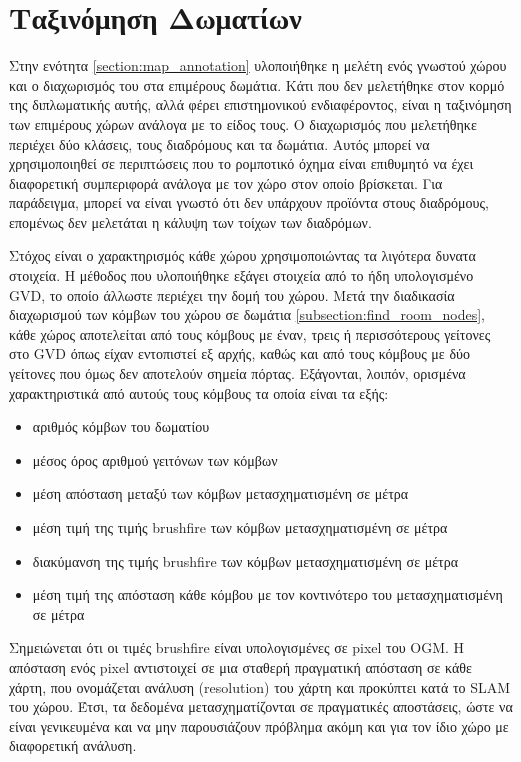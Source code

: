 \chapter{Ταξινόμηση Δωματίων}
\label{section:room_classification}

Στην ενότητα \ref{section:map_annotation} υλοποιήθηκε η μελέτη ενός γνωστού χώρου και ο διαχωρισμός του στα επιμέρους δωμάτια. Κάτι που δεν μελετήθηκε στον κορμό της διπλωματικής αυτής, αλλά φέρει επιστημονικού ενδιαφέροντος, είναι η ταξινόμηση των επιμέρους χώρων ανάλογα με το είδος τους. Ο διαχωρισμός που μελετήθηκε περιέχει δύο κλάσεις, τους διαδρόμους και τα δωμάτια. Αυτός μπορεί να χρησιμοποιηθεί σε περιπτώσεις που το ρομποτικό όχημα είναι επιθυμητό να έχει διαφορετική συμπεριφορά ανάλογα με τον χώρο στον οποίο βρίσκεται. Για παράδειγμα, μπορεί να είναι γνωστό ότι δεν υπάρχουν προϊόντα στους διαδρόμους, επομένως δεν μελετάται η κάλυψη των τοίχων των διαδρόμων. 

Στόχος είναι ο χαρακτηρισμός κάθε χώρου χρησιμοποιώντας τα λιγότερα δυνατα στοιχεία. Η μέθοδος που υλοποιήθηκε εξάγει στοιχεία από το ήδη υπολογισμένο GVD, το οποίο άλλωστε περιέχει την δομή του χώρου. Μετά την διαδικασία διαχωρισμού των κόμβων του χώρου σε δωμάτια \ref{subsection:find_room_nodes}, κάθε χώρος αποτελείται από τους κόμβους με έναν, τρεις ή περισσότερους γείτονες στο GVD όπως είχαν εντοπιστεί εξ αρχής, καθώς και από τους κόμβους με δύο γείτονες που όμως δεν αποτελούν σημεία πόρτας. Εξάγονται, λοιπόν, ορισμένα χαρακτηριστικά από αυτούς τους κόμβους τα οποία είναι τα εξής:

\begin{itemize}
    \setlength\itemsep{-0.2em}
    \item αριθμός κόμβων του δωματίου
    \item μέσος όρος αριθμού γειτόνων των κόμβων
    \item μέση απόσταση μεταξύ των κόμβων μετασχηματισμένη σε μέτρα
    \item μέση τιμή της τιμής brushfire των κόμβων μετασχηματισμένη σε μέτρα
    \item διακύμανση της τιμής brushfire των κόμβων μετασχηματισμένη σε μέτρα
    \item μέση τιμή της απόσταση κάθε κόμβου με τον κοντινότερο του μετασχηματισμένη σε μέτρα
\end{itemize}

Σημειώνεται ότι οι τιμές brushfire είναι υπολογισμένες σε pixel του OGM. Η απόσταση ενός pixel αντιστοιχεί σε μια σταθερή πραγματική απόσταση σε κάθε χάρτη, που ονομάζεται ανάλυση (resolution) του χάρτη και προκύπτει κατά το SLAM του χώρου. Έτσι, τα δεδομένα μετασχηματίζονται σε πραγματικές αποστάσεις, ώστε να είναι γενικευμένα και να μην παρουσιάζουν πρόβλημα ακόμη και για τον ίδιο χώρο με διαφορετική ανάλυση.

